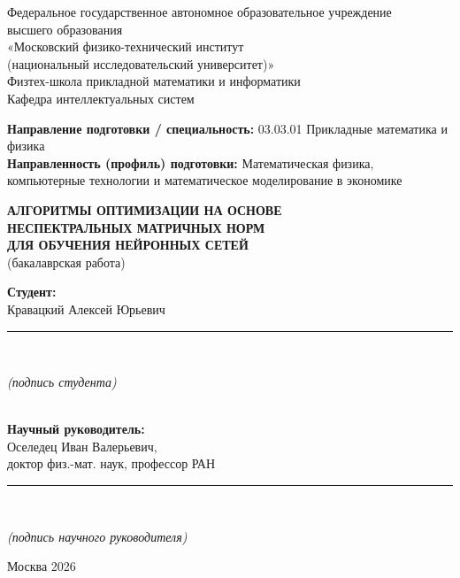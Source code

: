 \documentclass[a4paper,14pt,oneside]{extarticle}
\begin{document}
\onehalfspacing %

\thispagestyle{empty}
\begin{titlepage}
\begin{center}
Федеральное государственное автономное образовательное учреждение\\
высшего образования\\
«Московский физико-технический институт\\
(национальный исследовательский университет)»\\[1.5em]
Физтех-школа прикладной математики и информатики\\[1em]
Кафедра интеллектуальных систем
\end{center}

\vspace{2em}
\normalsize
\noindent\textbf{Направление подготовки / специальность:} 03.03.01 Прикладные математика и физика\\
\textbf{Направленность (профиль) подготовки:} Математическая физика, компьютерные технологии и математическое моделирование в экономике

\vspace{0pt plus3fill}

\begin{center}
\textbf{\large АЛГОРИТМЫ ОПТИМИЗАЦИИ НА ОСНОВЕ\\ НЕСПЕКТРАЛЬНЫХ МАТРИЧНЫХ НОРМ\\ ДЛЯ ОБУЧЕНИЯ НЕЙРОННЫХ СЕТЕЙ}\\[1em]
(бакалаврская работа)
\end{center}

\vspace{0pt plus3fill}

\hfill\begin{minipage}{0.6\textwidth}
\textbf{Студент:}\\
Кравацкий Алексей Юрьевич\\[2mm]
\rule{\textwidth}{0.5pt}\\
\centerline{\scriptsize \textit{(подпись студента)}}\\[1.5em]
\textbf{Научный руководитель:}\\
Оселедец Иван Валерьевич,\\
доктор физ.-мат. наук, профессор РАН\\[2mm]
\rule{\textwidth}{0.5pt}\\
\centerline{\scriptsize \textit{(подпись научного руководителя)}}
\end{minipage}

\vspace{0pt plus4fill}

\begin{center}
Москва 2026
\end{center}
\end{titlepage}
\setcounter{page}{2}
\end{document}
